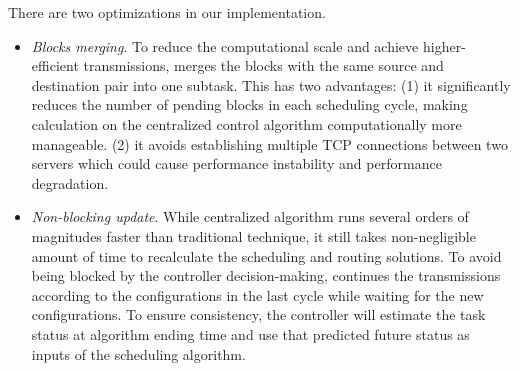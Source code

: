 There are two optimizations in our implementation.
\begin{itemize}
\item \emph{Blocks merging}.
To reduce the computational scale and achieve higher-efficient transmissions, \name merges the blocks with the same source and destination pair into one subtask.
This has two advantages: (1) it significantly reduces the number of pending blocks in each scheduling cycle, making calculation on the centralized control algorithm computationally more manageable.
(2) it avoids establishing multiple TCP connections between two servers which could cause performance instability and  performance degradation.
\item \emph{Non-blocking update}. While \name centralized algorithm runs several orders of magnitudes faster than traditional technique, it still takes non-negligible amount of time to recalculate the scheduling and routing solutions. To avoid being blocked by the controller decision-making, \name continues the transmissions according to the configurations in the last cycle while waiting for the new configurations. To ensure consistency, the controller will estimate the task status at algorithm ending time and use that predicted future status as inputs of the scheduling algorithm.
\end{itemize}

%
%
%
%

